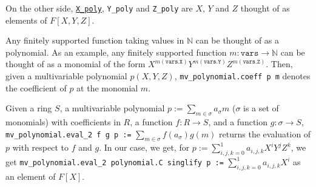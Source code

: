 \documentclass{article}
\theoremstyle{definition}
\theoremstyle{remark}
\begin{document}
On the other side, \href{https://github.com/BoltonBailey/formal-snarks-project/blob/7fd9cd122f5887f88f6a706b4f2a68a7153c7381/src/snarks/babysnark/knowledge_soundness.lean#L145}{\texttt{X\_poly}}, \texttt{Y\_poly} and 
\texttt{Z\_poly} are $X$, $Y$ and $Z$ thought of as elements of $F[X, Y, Z]$.

Any finitely supported function taking values in $\mathbb{N}$ can be thought of as a polynomial. As an example, any finitely supported function 
$m : \texttt{vars} \to \mathbb{N}$ can be thought of as a monomial of the form $X^{m(\texttt{vars.X})} Y^{m(\texttt{vars.Y})} Z^{m(\texttt{vars.Z})}$. Then, 
given a multivariable polynomial $p(X, Y, Z)$, \texttt{mv\_polynomial.coeff p m} denotes the coefficient of $p$ at the monomial $m$.

Given a ring $S$, a multivariable polynomial $p := \sum_{m \in \sigma} a_{\sigma} m$ ($\sigma$ is a set of monomials) with coefficients in $R$, 
a function $f : R \to S$, and a function $g : \sigma \to S$, \texttt{mv\_polynomial.eval\_2 f g p :=} $\sum_{m \in \sigma} f(a_{\sigma}) g(m)$ returns the evaluation of $p$ with respect to $f$ and $g$. 
In our case, we get, for $p := \sum_{i, j, k = 0}^{1} a_{i, j ,k} X^i Y^j Z^k$, we get \texttt{mv\_polynomial.eval\_2 polynomial.C singlify p :=} $\sum_{i, j, k = 0}^{1} a_{i, j ,k} X^i$ as an element of $F[X]$.
\end{document}
